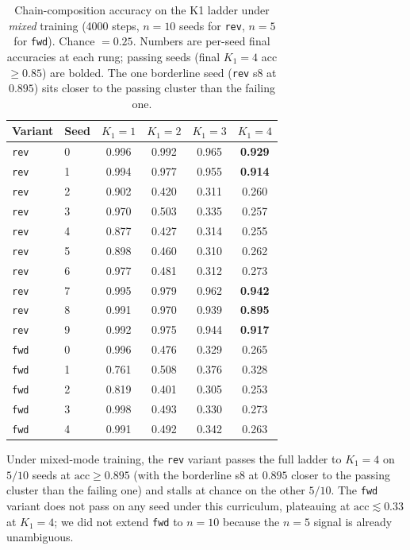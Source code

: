 \documentclass[11pt]{article}
\newcommand{\claim}[1]{#1}
\begin{document}
\begin{table}[h]
\centering
\caption{Chain-composition accuracy on the K1 ladder under \emph{mixed}
training (4000 steps, $n = 10$ seeds for \texttt{rev}, $n = 5$ for
\texttt{fwd}). Chance $= 0.25$. Numbers are per-seed final accuracies
at each rung; passing seeds (final $K_1{=}4$ acc $\geq 0.85$) are
bolded. The one borderline seed (\texttt{rev} s8 at $0.895$) sits
closer to the passing cluster than the failing one.}
\label{tab:ladder-mixed}
\begin{tabular}{llcccc}
\toprule
Variant & Seed & $K_1 = 1$ & $K_1 = 2$ & $K_1 = 3$ & $K_1 = 4$ \\
\midrule
\texttt{rev} & 0 & 0.996 & 0.992 & 0.965 & \textbf{0.929} \\
\texttt{rev} & 1 & 0.994 & 0.977 & 0.955 & \textbf{0.914} \\
\texttt{rev} & 2 & 0.902 & 0.420 & 0.311 & 0.260 \\
\texttt{rev} & 3 & 0.970 & 0.503 & 0.335 & 0.257 \\
\texttt{rev} & 4 & 0.877 & 0.427 & 0.314 & 0.255 \\
\texttt{rev} & 5 & 0.898 & 0.460 & 0.310 & 0.262 \\
\texttt{rev} & 6 & 0.977 & 0.481 & 0.312 & 0.273 \\
\texttt{rev} & 7 & 0.995 & 0.979 & 0.962 & \textbf{0.942} \\
\texttt{rev} & 8 & 0.991 & 0.970 & 0.939 & \textbf{0.895} \\
\texttt{rev} & 9 & 0.992 & 0.975 & 0.944 & \textbf{0.917} \\
\midrule
\texttt{fwd} & 0 & 0.996 & 0.476 & 0.329 & 0.265 \\
\texttt{fwd} & 1 & 0.761 & 0.508 & 0.376 & 0.328 \\
\texttt{fwd} & 2 & 0.819 & 0.401 & 0.305 & 0.253 \\
\texttt{fwd} & 3 & 0.998 & 0.493 & 0.330 & 0.273 \\
\texttt{fwd} & 4 & 0.991 & 0.492 & 0.342 & 0.263 \\
\bottomrule
\end{tabular}
\end{table}

Under mixed-mode training, the \texttt{rev} variant passes the full
ladder to $K_1{=}4$ on \claim{$5/10$} seeds at $\text{acc} \geq 0.895$
(with the borderline s8 at $0.895$ closer to the passing cluster than
the failing one) and stalls at chance on the other $5/10$. The
\texttt{fwd} variant does not pass on any seed under this curriculum,
plateauing at \claim{$\text{acc} \lesssim 0.33$} at $K_1 = 4$; we did
not extend \texttt{fwd} to $n{=}10$ because the $n{=}5$ signal is
already unambiguous.
\end{document}

